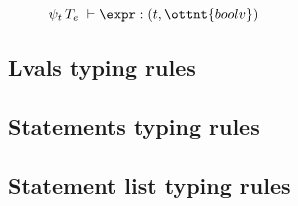 \begin{figure}[ht!]
    \begin{ottdefnblock}[#1]{$ \psi_t  \,  T_e  \; \vdash  \expr  : (  t  ,  \ottnt{boolv}  ) $}{} \end{ottdefnblock}
    \ottusedrule{\ottdruleeXXtypXXv{}}
    \ottusedrule{\ottdruleeXXtypXXvar{}}
    \ottusedrule{\ottdruleeXXtypXXstar{}}
    \ottusedrule{\ottdruleeXXtypXXstruct{}}
    \ottusedrule{\ottdruleeXXtypXXheader{}}
    \ottusedrule{\ottdruleeXXtypXXnotXXneg{}}
    \ottusedrule{\ottdruleeXXtypXXisXXneg{}}
    \ottusedrule{\ottdruleeXXtypXXacc{}}
    \ottusedrule{\ottdruleeXXtypXXconcat{}}
\end{figure}

\begin{figure}[ht!]
    \ottusedrule{\ottdruleeXXtypXXslice{}}
    \ottusedrule{\ottdruleeXXtypXXselect{}}
    \ottusedrule{\ottdruleeXXtypXXcall{}}
    \ottusedrule{\ottdruleeXXtypXXbinopXXbv{}}
    \ottusedrule{\ottdruleeXXtypXXbinopXXbool{}}
    \ottusedrule{\ottdruleeXXtypXXbinopXXerr{}}
    \ottusedrule{\ottdruleeXXtypXXbinopXXbvXXbool{}}
    \ottusedrule{\ottdruleeXXtypXXsaved{}}
\end{figure}

\newpage
\subsection{Lvals typing rules}

\begin{figure}[ht!]
    \ottusedrule{\ottdrulelvalXXtypXXvar{}}
    \ottusedrule{\ottdrulelvalXXtypXXacc{}}
    \ottusedrule{\ottdrulelvalXXtypXXslice{}}
\end{figure}

\newpage
\subsection{Statements typing rules}

\begin{figure}[ht!]
    \ottusedrule{\ottdrulestmtXXtypXXempty{}}
    \ottusedrule{\ottdrulestmtXXtypXXassign{}}
    \ottusedrule{\ottdrulestmtXXtypXXassignXXnull{}}
    \ottusedrule{\ottdrulestmtXXtypXXif{}}
    \ottusedrule{\ottdrulestmtXXtypXXdecl{}}
    \ottusedrule{\ottdrulestmtXXtypXXseq{}}
    \ottusedrule{\ottdrulestmtXXtypXXverify{}}
    \ottusedrule{\ottdrulestmtXXtypXXtransition{}}
    \ottusedrule{\ottdrulestmtXXtypXXreturn{}}
    \ottusedrule{\ottdrulestmtXXtypXXapply{}}
    \ottusedrule{\ottdrulestmtXXtypXXext{}}
\end{figure}



\newpage
\subsection{Statement list typing rules}
\ottdefnsstmtlXXtyp


